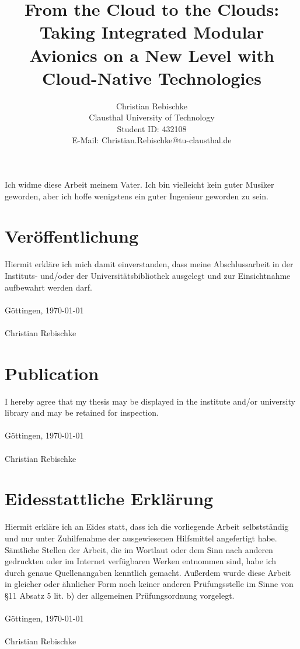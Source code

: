 \documentclass[titlepage]{report}
\title{From the Cloud to the Clouds: Taking Integrated Modular Avionics on a New Level with Cloud-Native Technologies}
\author{Christian Rebischke\\
Clausthal University of Technology\\
Student ID: 432108 \\
E-Mail: Christian.Rebischke@tu-clausthal.de}
\begin{document}
\maketitle
{}
\chapter*{}
\vspace*{25mm}
\begin{center}
Ich widme diese Arbeit meinem Vater. Ich bin vielleicht kein guter Musiker geworden, aber ich hoffe wenigstens ein guter Ingenieur geworden zu sein.
\end{center}
\vspace*{25mm}

\chapter*{Veröffentlichung}
Hiermit erkläre ich mich damit einverstanden, dass meine Abschlussarbeit in der Instituts- und/oder der Universitätsbibliothek ausgelegt und zur
Einsichtnahme aufbewahrt werden darf.
\\
\\
Göttingen, \today
\\
\\
Christian Rebischke

\chapter*{Publication}
I hereby agree that my thesis may be displayed in the institute and/or university library and
may be retained for inspection.
\\
\\
Göttingen, \today
\\
\\
Christian Rebischke

\chapter*{Eidesstattliche Erklärung}
Hiermit erkläre ich an Eides statt, dass ich die vorliegende Arbeit selbstständig und nur unter Zuhilfenahme der ausgewiesenen Hilfsmittel angefertigt habe.
Sämtliche Stellen der Arbeit, die im Wortlaut oder dem Sinn nach anderen gedruckten oder im Internet verfügbaren Werken entnommen sind, habe ich durch
genaue Quellenangaben kenntlich gemacht. Außerdem wurde diese Arbeit in gleicher oder ähnlicher Form noch keiner anderen Prüfungsstelle im Sinne von
\S11 Absatz 5 lit. b) der allgemeinen Prüfungsordnung vorgelegt.
\\
\\
Göttingen, \today
\\
\\
Christian Rebischke
\end{document}
